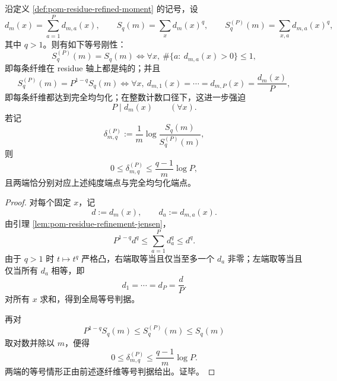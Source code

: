 \begin{theorem}\label{thm:conclusion-residue-refinement-purity-uniformization-endpoint-rigidity}
沿定义 \ref{def:pom-residue-refined-moment} 的记号，设
\[
d_m(x)=\sum_{a=1}^{P}d_{m,a}(x),
\qquad
S_q(m)=\sum_x d_m(x)^q,
\qquad
S_q^{(P)}(m)=\sum_{x,a} d_{m,a}(x)^q,
\]
其中 \(q>1\)。则有如下等号刚性：
\[
S_q^{(P)}(m)=S_q(m)
\iff
\forall x,\ \#\{a:\ d_{m,a}(x)>0\}\le 1,
\]
即每条纤维在 residue 轴上都是纯的；并且
\[
S_q^{(P)}(m)=P^{1-q}S_q(m)
\iff
\forall x,\ d_{m,1}(x)=\cdots=d_{m,P}(x)=\frac{d_m(x)}{P},
\]
即每条纤维都达到完全均匀化；在整数计数口径下，这进一步强迫
\[
P\mid d_m(x)\qquad (\forall x).
\]
若记
\[
\delta_{m,q}^{(P)}:=\frac1m\log\frac{S_q(m)}{S_q^{(P)}(m)},
\]
则
\[
0\le \delta_{m,q}^{(P)}\le \frac{q-1}{m}\log P,
\]
且两端恰分别对应上述纯度端点与完全均匀化端点。
\end{theorem}
\begin{proof}
对每个固定 \(x\)，记
\[
d:=d_m(x),
\qquad
d_a:=d_{m,a}(x).
\]
由引理 \ref{lem:pom-residue-refinement-jensen}，
\[
P^{1-q}d^q\le \sum_{a=1}^{P}d_a^q\le d^q.
\]
由于 \(q>1\) 时 \(t\mapsto t^q\) 严格凸，右端取等当且仅当至多一个 \(d_a\) 非零；左端取等当且仅当所有 \(d_a\) 相等，即
\[
d_1=\cdots=d_P=\frac dP.
\]
对所有 \(x\) 求和，得到全局等号判据。

再对
\[
P^{1-q}S_q(m)\le S_q^{(P)}(m)\le S_q(m)
\]
取对数并除以 \(m\)，便得
\[
0\le \delta_{m,q}^{(P)}\le \frac{q-1}{m}\log P.
\]
两端的等号情形正由前述逐纤维等号判据给出。证毕。
\end{proof}

